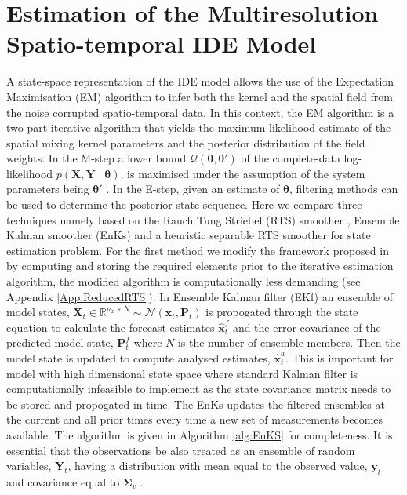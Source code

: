 \documentclass[11pt,draftcls,onecolumn,peerreview]{IEEEtran}
\begin{document}
\section{Estimation of the Multiresolution Spatio-temporal IDE Model}
A state-space representation of the IDE model allows the use of the Expectation Maximisation (EM) algorithm to infer both the kernel and the spatial field from the noise corrupted spatio-temporal data. In this context, the EM algorithm is a two part iterative algorithm that yields the maximum likelihood estimate of the spatial mixing kernel parameters and the posterior distribution of the field weights. In the M-step a lower bound $\mathcal{Q}\left(\boldsymbol\theta,\boldsymbol\theta'\right)$ of the complete-data log-likelihood  $p\left(\mathbf{X},\mathbf{Y} \mid \boldsymbol\theta \right)$, is maximised under the assumption of the system parameters being $\boldsymbol\theta'$ \cite{McLachlan1997}. In the E-step, given an estimate of $\boldsymbol\theta$, filtering methods can be used to determine the posterior state sequence. Here we compare three techniques namely based on  the Rauch Tung Striebel (RTS) smoother \cite{Gibsona2005}, Ensemble Kalman smoother (EnKs) \cite{Evensen2003} and a heuristic separable RTS smoother for state estimation problem. For the first method we modify the framework proposed in \cite{Dewar2009} by computing and storing the required elements prior to the iterative estimation algorithm, the modified algorithm is computationally less demanding (see Appendix \ref{App:ReducedRTS}). In Ensemble Kalman filter (EKf) an ensemble of model states, $\mathbf X_t \in \mathbb R^{n_x \times N} \sim \mathcal N(\mathbf x_t,\mathbf P_t)$ is propogated through the state equation to calculate the forecast estimates $\hat{\mathbf x}^f_t$ and the error covariance of the predicted model state, $\mathbf P_t^f$ where $N$ is the number of ensemble members. Then  the model state is updated to compute analysed estimates, $\hat {\mathbf x}_t^a$.  This is important for model with high dimensional state space where standard Kalman filter  is computationally infeasible to implement as the state covariance matrix needs to be stored and propogated in time. The EnKs updates the filtered ensembles at the current and all prior times every time a new set of measurements becomes available. The algorithm is given in Algorithm \ref{alg:EnKS} for completeness. It is essential that the observations be also treated as an ensemble of random variables, $\mathbf Y_t$, having a distribution with mean equal to the observed value, $\mathbf y_t$ and covariance equal to $\boldsymbol\Sigma_v$ \cite{Houtekamer2005}. 
\end{document}
